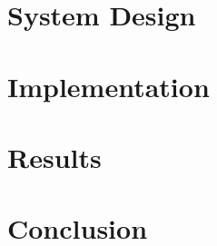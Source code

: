 \documentclass[a4paper, 11pt, oneside]{report}
\begin{document}
        \chapter{System Design}
        
        \chapter{Implementation}
        
        \chapter{Results}
        
        \chapter{Conclusion}
        
        
        
	
        
	
	
	
	
\end{document}
